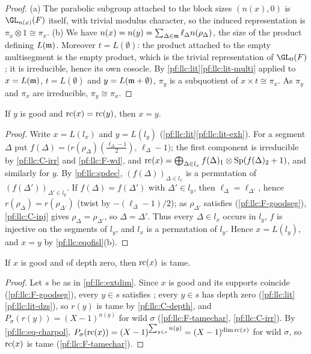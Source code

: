 \begin{proof}
(a) The parabolic subgroup attached to the block sizes $(n(x),0)$ is $\GL_{n(x)}(F)$ itself, with trivial modulus character,
so the induced representation is $\pi_x\otimes1\cong\pi_x$. (b) We have $n(x)=n(y)=\sum_{\Delta\in\mathfrak m}\ell_\Delta n(\rho_\Delta)$, the
size of the product defining $L(\mathfrak m)$. Moreover $t=L(\emptyset)$: the product attached to the empty multisegment is the
empty product, which is the trivial representation of $\GL_0(F)$; it is irreducible, hence its own cosocle. By \cref{pf:llc:lit}\ref{pf:llc:lit-multi} applied to $x=L(\mathfrak m)$, $t=L(\emptyset)$ and $y=L(\mathfrak m+\emptyset)$,
$\pi_y$ is a subquotient of $x\times t\cong\pi_x$. As $\pi_y$ and $\pi_x$ are irreducible, $\pi_y\cong\pi_x$.
\end{proof}

\begin{proposition}\label{pf:llc:extinj}
If $y$ is good and $\mathrm{rc}(x)=\mathrm{rc}(y)$, then $x=y$. 
\end{proposition}

\begin{proof}
Write $x=L(l_x)$ and $y=L(l_y)$ (\cref{pf:llc:lit}\ref{pf:llc:lit-exh}). For a segment $\Delta$ put
$f(\Delta)=\bigl(r(\rho_\Delta)(\tfrac{\ell_\Delta-1}2),\,\ell_\Delta-1\bigr)$; the first component is irreducible by \ref{pf:llc:C-irr}
and \ref{pf:llc:F-wd}, and $\mathrm{rc}(x)=\bigoplus_{\Delta\in l_x}f(\Delta)_1\otimes\operatorname{Sp}(f(\Delta)_2+1)$, and similarly for $y$. By
\cref{pf:llc:spdec}, $(f(\Delta))_{\Delta\in l_x}$ is a permutation of $(f(\Delta'))_{\Delta'\in l_y}$. If $f(\Delta)=f(\Delta')$ with
$\Delta'\in l_y$, then $\ell_\Delta=\ell_{\Delta'}$, hence $r(\rho_\Delta)=r(\rho_{\Delta'})$ (twist by $-(\ell_\Delta-1)/2$); as
$\rho_{\Delta'}$ satisfies \llcGo{} (\ref{pf:llc:F-goodseg}), \ref{pf:llc:C-inj} gives $\rho_\Delta=\rho_{\Delta'}$, so $\Delta=\Delta'$.
Thus every $\Delta\in l_x$ occurs in $l_y$, $f$ is injective on the segments of $l_y$, and $l_x$ is a permutation of $l_y$. Hence
$x=L(l_y)$, and $x=y$ by \cref{pf:llc:eqofisl}(b).
\end{proof}

\begin{proposition}[Depth]\label{pf:llc:extdepth}
If $x$ is good and of depth zero, then $\mathrm{rc}(x)$ is tame. 
\end{proposition}

\begin{proof}
Let $s$ be as in \cref{pf:llc:extdim}. Since $x$ is good and its supports coincide (\ref{pf:llc:F-goodseg}), every $y\in s$
satisfies \llcGo{}; every $y\in s$ has depth zero (\cref{pf:llc:lit}\ref{pf:llc:lit-dzs}), so $r(y)$ is tame by
\ref{pf:llc:C-depth}, and $P_\sigma(r(y))=(X-1)^{n(y)}$ for wild $\sigma$ (\ref{pf:llc:F-tamechar}, \ref{pf:llc:C-irr}). By
\eqref{pf:llc:eq-charpol}, $P_\sigma(\mathrm{rc}(x))=(X-1)^{\sum_{y\in s}n(y)}=(X-1)^{\dim\mathrm{rc}(x)}$ for wild $\sigma$, so $\mathrm{rc}(x)$ is
tame (\ref{pf:llc:F-tamechar}).
\end{proof}

